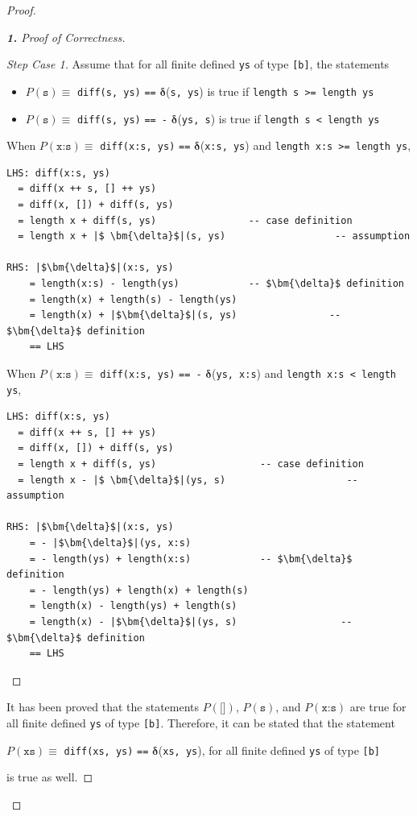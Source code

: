 \documentclass[12pt]{article}
\newcommand{\haskell}{\texttt}
\begin{document}
\begin{proof}
\begin{proof}[\textbf{1.} Proof of Correctness]
\begin{proof}[Step Case 1]
Assume that for all finite defined \haskell{ys} of type \haskell{[b]}, the statements
\begin{itemize}
    \item $P(\haskell{s}) \equiv$ \haskell{diff(s, ys)} \haskell{==} $\bm{\delta}$(\haskell{s, ys}) is true if \haskell{length s >= length ys}
    \item $P(\haskell{s}) \equiv$ \haskell{diff(s, ys)} \haskell{== -} $\bm{\delta}$(\haskell{ys, s}) is true if \haskell{length s < length ys}
\end{itemize}
When $P(\haskell{x:s}) \equiv$ \haskell{diff(x:s, ys)} \haskell{==} $\bm{\delta}$(\haskell{x:s, ys}) and \haskell{length x:s >= length ys}, 
\begin{mdframed}
\begin{verbatim}
LHS: diff(x:s, ys)
  = diff(x ++ s, [] ++ ys)
  = diff(x, []) + diff(s, ys)
  = length x + diff(s, ys)                -- case definition
  = length x + |$ \bm{\delta}$|(s, ys)                   -- assumption

RHS: |$\bm{\delta}$|(x:s, ys)
    = length(x:s) - length(ys)            -- $\bm{\delta}$ definition
    = length(x) + length(s) - length(ys)
    = length(x) + |$\bm{\delta}$|(s, ys)                -- $\bm{\delta}$ definition
    == LHS
\end{verbatim}
\end{mdframed}

\newpage When $P(\haskell{x:s}) \equiv$ \haskell{diff(x:s, ys)} \haskell{== -} $\bm{\delta}$(\haskell{ys, x:s}) and \haskell{length x:s < length ys}, 
\begin{mdframed}
\begin{verbatim}
LHS: diff(x:s, ys)
  = diff(x ++ s, [] ++ ys)
  = diff(x, []) + diff(s, ys)
  = length x + diff(s, ys)                  -- case definition
  = length x - |$ \bm{\delta}$|(ys, s)                     -- assumption

RHS: |$\bm{\delta}$|(x:s, ys)
    = - |$\bm{\delta}$|(ys, x:s)
    = - length(ys) + length(x:s)            -- $\bm{\delta}$ definition
    = - length(ys) + length(x) + length(s)
    = length(x) - length(ys) + length(s)
    = length(x) - |$\bm{\delta}$|(ys, s)                  -- $\bm{\delta}$ definition
    == LHS
\end{verbatim}
\end{mdframed}
\end{proof}
It has been proved that the statements $P(\haskell{[]})$, $P(\haskell{s})$, and $P(\haskell{x:s})$ are true for all finite defined \haskell{ys} of type \haskell{[b]}. Therefore, it can be stated that the statement
\begin{center}
    $P(\haskell{xs}) \equiv$ \haskell{diff(xs, ys)} \haskell{==} $\bm{\delta}$(\haskell{xs, ys}), for all finite defined \haskell{ys} of type \haskell{[b]}
\end{center}
is true as well.


\end{proof}
\end{proof}
\end{document}
